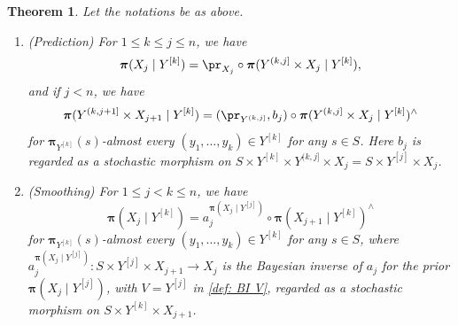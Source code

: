 \documentclass[12pt,reqno]{amsart}%
\theoremstyle{plain}
\newtheorem{theorem}{Theorem}[section]
\theoremstyle{definition}
\def\bspi{\boldsymbol{\pi}}
\begin{document}
\begin{theorem}\label{thm: PS}
	Let the notations be as above.
	\begin{enumerate}[label=(\roman*)]
		\item (Prediction) For $1\leq k\leq j\leq n$, we have
		\[
			\bspi(X_j\mid Y^{[k]})=\pr_{X_j}\circ\bspi(Y^{(k,j]}\times X_j\mid Y^{[k]}),
		\]
		and if $j<n$, we have
		\[
			\bspi(Y^{(k,j+1]}\times X_{j+1}\mid Y^{[k]})
			=(\pr_{Y^{(k,j]}},b_j)\circ\bspi(Y^{(k,j]}\times X_j\mid Y^{[k]})^\wedge
		\]
		for $\bspi_{Y^{[k]}}(s)$-almost every $(y_1,\ldots,y_k)\in Y^{[k]}$ for any $s\in S$.
		Here $b_j$ is regarded as a stochastic morphism on $S\times Y^{[k]}\times Y^{(k,j]}\times X_j=S\times Y^{[j]}\times X_j$.
		\item (Smoothing) For $1\leq j < k\leq n$, we have
		\[
			\bspi(X_j\mid Y^{[k]})=a_j^{\bspi(X_j\mid Y^{[j]})}\circ\bspi(X_{j+1}\mid Y^{[k]})^\wedge
		\]
		for $\bspi_{Y^{[k]}}(s)$-almost every $(y_1,\ldots,y_k)\in Y^{[k]}$ for any $s\in S$,
		where $a_j^{\bspi(X_j\mid Y^{[j]})}\colon S\times Y^{[j]}\times X_{j+1}\rightarrow X_j$
		is the Bayesian inverse of $a_j$ for the prior $\bspi(X_j\mid Y^{[j]})$,
		with $V=Y^{[j]}$ in \cref{def: BI V},
		regarded as a stochastic morphism on $S\times Y^{[k]}\times X_{j+1}$.
	\end{enumerate}
\end{theorem}
\end{document}
